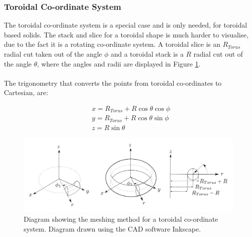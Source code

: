 \documentclass[12pt,a4paper]{article}
\begin{document}
\subsubsection{Toroidal Co-ordinate System}

The toroidal co-ordinate system is a special case and is only needed, for toroidal based solids. The stack and slice for a toroidal shape is much harder to visualise, due to the fact it is a rotating co-ordinate system. A toroidal slice is an $R_{Torus}$ radial cut taken out of the angle $\phi$ and a toroidal stack is a $R$ radial cut out of the angle $\theta$, where the angles and radii are displayed in Figure \ref{tormeshin}. 
\\\\
The trigonometry that converts the points from toroidal co-ordinates to Cartesian, are:

\begin{equation}
\begin{aligned}
& x = R_{Torus} + R\cos{\theta}\cos{\phi} \\
& y = R_{Torus} + R\cos{\theta}\sin{\phi} \\
& z =  R\sin{\theta} 
\end{aligned}
\end{equation}

\begin{figure}[h!]
\centering
\includegraphics[scale=0.35]{Images//Coords/torus_coords.png}
\caption[width=\columnwidth]{Diagram showing the meshing method for a toroidal co-ordinate system. Diagram drawn using the CAD software Inkscape.}
\label{tormeshin}
\end{figure}
\end{document}

